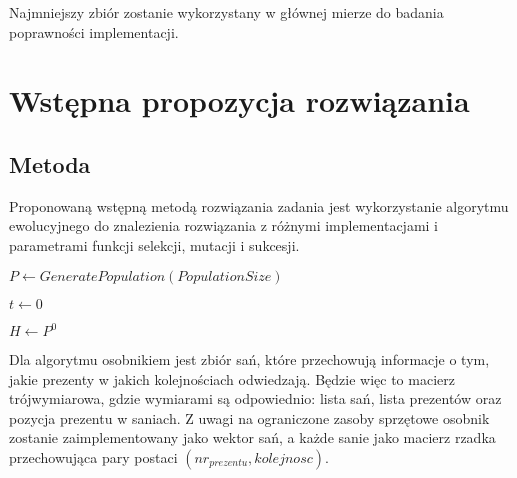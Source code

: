 \documentclass[titlepage]{article}
\begin{document}
            Najmniejszy zbiór zostanie wykorzystany w głównej mierze do badania poprawności implementacji.

    \section{
        Wstępna propozycja rozwiązania
    }
        \subsection{
            Metoda
        }
            Proponowaną wstępną metodą rozwiązania zadania jest wykorzystanie algorytmu ewolucyjnego
            do znalezienia rozwiązania z różnymi implementacjami i parametrami funkcji selekcji, 
            mutacji i sukcesji.

            \begin{algorithm}[H]
                 {

                    $P \gets GeneratePopulation(PopulationSize)$

                    $t \gets 0$

                    $H \gets P^0$

                }
            \end{algorithm}

            Dla algorytmu osobnikiem jest zbiór sań, które przechowują informacje o tym, 
            jakie prezenty w jakich kolejnościach odwiedzają. Będzie więc to macierz trójwymiarowa, 
            gdzie wymiarami są odpowiednio: lista sań, lista prezentów oraz pozycja prezentu w saniach. 
            Z uwagi na ograniczone zasoby sprzętowe osobnik zostanie zaimplementowany jako wektor sań, 
            a każde sanie jako macierz rzadka przechowująca pary postaci $(nr_{prezentu}, kolejnosc)$.
\end{document}

